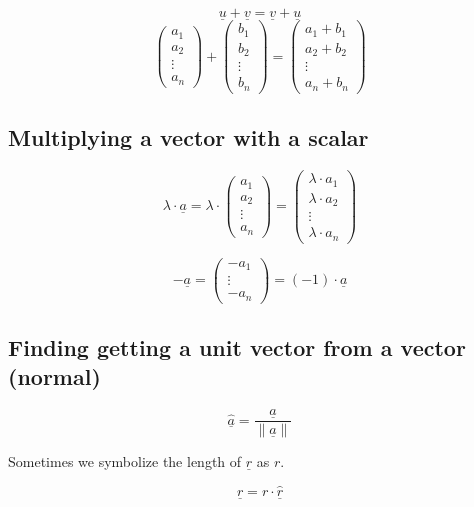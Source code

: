 \documentclass[00_complete]{subfiles}
\begin{document}
$$\underline u + \underline v = \underline v + \underline u$$
$$\begin{pmatrix}
    a_1 \\a_2\\\vdots\\a_n
\end{pmatrix}+\begin{pmatrix}
    b_1 \\b_2\\\vdots\\b_n
\end{pmatrix}=\begin{pmatrix}
    a_1+b_1\\a_2+b_2\\\vdots\\a_n+b_n
\end{pmatrix}$$

\subsection{Multiplying a vector with a scalar}

$$\lambda \cdot \underline a  = \lambda \cdot \begin{pmatrix}
    a_1\\a_2\\\vdots\\a_n
\end{pmatrix} = \begin{pmatrix}
    \lambda \cdot a_1 \\
    \lambda \cdot a_2 \\
    \vdots \\
    \lambda \cdot a_n
\end{pmatrix}$$

$$- \underline a = \begin{pmatrix}
    -a_1\\\vdots\\-a_n
\end{pmatrix} = (-1) \cdot \underline a$$

\subsection{Finding getting a unit vector from a vector (normal)}

$$\underline{\hat a} = \frac{\underline a}{\|\underline a\|}$$

Sometimes we symbolize the length of $\underline r$ as $r$.

$$\underline r = r \cdot \underline{\hat r}$$
\end{document}
